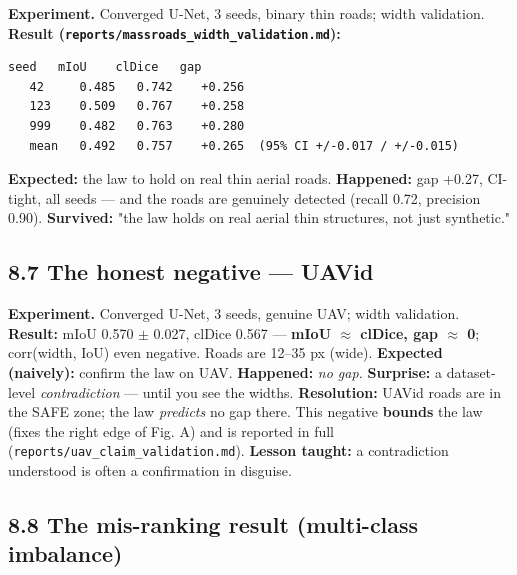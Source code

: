 \documentclass[11pt]{article}
\begin{document}
\textbf{Experiment.} Converged U-Net, 3 seeds, binary thin roads; width validation. \textbf{Result (\texttt{reports/massroads\_width\_validation.md}):}
\begin{Verbatim}[breaklines=true,breakanywhere=true,fontsize=\footnotesize]
   seed   mIoU    clDice   gap
   42     0.485   0.742    +0.256
   123    0.509   0.767    +0.258
   999    0.482   0.763    +0.280
   mean   0.492   0.757    +0.265  (95% CI +/-0.017 / +/-0.015)
\end{Verbatim}
\textbf{Expected:} the law to hold on real thin aerial roads. \textbf{Happened:} gap +0.27, CI-tight, all seeds --- and the roads are genuinely detected (recall 0.72, precision 0.90). \textbf{Survived:} "the law holds on real aerial thin structures, not just synthetic."

\subsection*{8.7 The honest negative --- UAVid}

\textbf{Experiment.} Converged U-Net, 3 seeds, genuine UAV; width validation. \textbf{Result:} mIoU 0.570 $\pm$ 0.027, clDice 0.567 --- \textbf{mIoU $\approx$ clDice, gap $\approx$ 0}; corr(width, IoU) even negative. Roads are 12--35 px (wide). \textbf{Expected (naively):} confirm the law on UAV. \textbf{Happened:} \textit{no gap.} \textbf{Surprise:} a dataset-level \textit{contradiction} --- until you see the widths. \textbf{Resolution:} UAVid roads are in the SAFE zone; the law \textit{predicts} no gap there. This negative \textbf{bounds} the law (fixes the right edge of Fig. A) and is reported in full (\texttt{reports/uav\_claim\_validation.md}). \textbf{Lesson taught:} a contradiction understood is often a confirmation in disguise.

\subsection*{8.8 The mis-ranking result (multi-class imbalance)}
\end{document}
